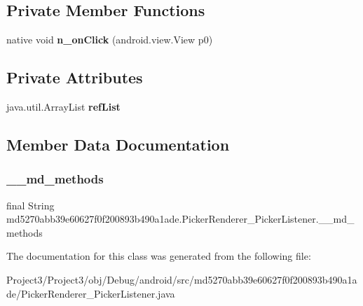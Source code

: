 \subsection*{Private Member Functions}
\begin{DoxyCompactItemize}
\item 
\mbox{\label{classmd5270abb39e60627f0f200893b490a1ade_1_1PickerRenderer__PickerListener_af7485a983e27982e45d9a0b9eacd6ab5}} 
native void {\bfseries n\+\_\+on\+Click} (android.\+view.\+View p0)
\end{DoxyCompactItemize}
\subsection*{Private Attributes}
\begin{DoxyCompactItemize}
\item 
\mbox{\label{classmd5270abb39e60627f0f200893b490a1ade_1_1PickerRenderer__PickerListener_ab8b564f9c49032cb1d7d689a8ca19e1a}} 
java.\+util.\+Array\+List {\bfseries ref\+List}
\end{DoxyCompactItemize}


\subsection{Member Data Documentation}
\mbox{\label{classmd5270abb39e60627f0f200893b490a1ade_1_1PickerRenderer__PickerListener_a0364241ced938474af94b5858f99e10d}} 
\subsubsection{\texorpdfstring{\+\_\+\+\_\+md\+\_\+methods}{\_\_md\_methods}}
{\footnotesize\ttfamily final String md5270abb39e60627f0f200893b490a1ade.\+Picker\+Renderer\+\_\+\+Picker\+Listener.\+\_\+\+\_\+md\+\_\+methods\hspace{0.3cm}{\ttfamily [static]}}



The documentation for this class was generated from the following file\+:\begin{DoxyCompactItemize}
\item 
Project3/\+Project3/obj/\+Debug/android/src/md5270abb39e60627f0f200893b490a1ade/Picker\+Renderer\+\_\+\+Picker\+Listener.\+java\end{DoxyCompactItemize}
